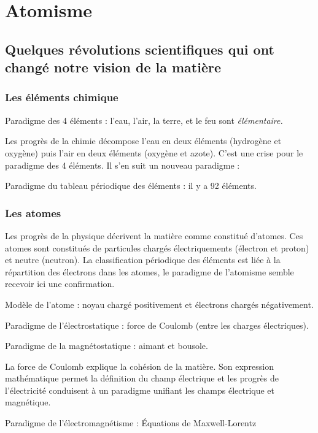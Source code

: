 \chapter{Atomisme}

\section{Quelques révolutions scientifiques qui ont changé notre vision de la matière}

\subsection{Les éléments chimique}
\begin{center}
Paradigme des 4 éléments : l'eau, l'air, la terre, et le feu sont \it{élémentaire}.
\end{center}

Les progrès de la chimie décompose l'eau en deux éléments (hydrogène et oxygène) puis l'air en deux éléments (oxygène et azote). C'est une crise pour le paradigme des 4 éléments. Il s'en suit un nouveau paradigme :

\begin{center}
Paradigme du tableau périodique des éléments : il y a 92 éléments.
\end{center}

\subsection{Les atomes}

Les progrès de la physique décrivent la matière comme constitué d'atomes. Ces atomes sont constitués de particules chargés électriquements (électron et proton) et neutre (neutron). La classification périodique des éléments est liée à la répartition des électrons dans les atomes, le paradigme de l'atomisme semble recevoir ici une confirmation.
\begin{center}
Modèle de l'atome : noyau chargé positivement et électrons chargés négativement.
\end{center}

\begin{center}
Paradigme de l'électrostatique : force de Coulomb (entre les charges électriques).

Paradigme de la magnétostatique : aimant et bousole.
\end{center}

La force de Coulomb explique la cohésion de la matière. Son expression mathématique permet la définition du champ électrique et les progrès de l'électricité conduisent à un paradigme unifiant les champs électrique et magnétique.

\begin{center}
Paradigme de l'électromagnétisme : Équations de Maxwell-Lorentz
\end{center}

\subsection{}\subsection{}
\begin{center}
\end{center}

